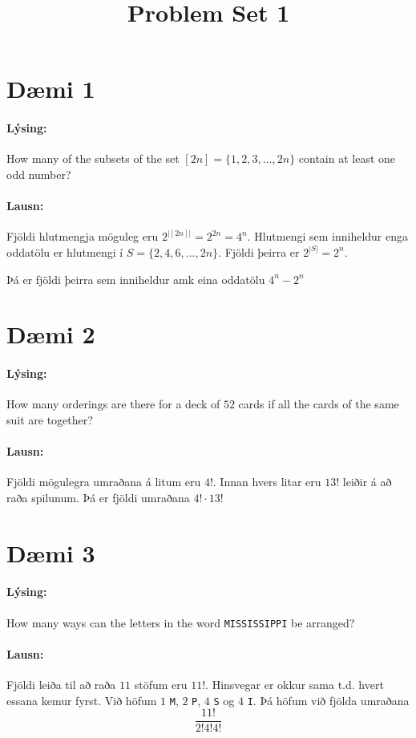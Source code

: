 \documentclass[a4paper,notitlepage]{article}
\title{\vspace{-1em}Problem Set 1\vspace{-2em}}
\date{}
\author{}
\theoremstyle{plain}
\theoremstyle{definition}
\begin{document}
\maketitle
\thispagestyle{firstpage}

\section*{Dæmi 1}
\paragraph{Lýsing:} How many of the subsets of the set $[2n] = \{1,2,3,\dots,2n\}$ contain at least one odd number?

\paragraph{Lausn:}
Fjöldi hlutmengja möguleg eru $2^{|[2n]|} = 2^{2n} = 4^n$. Hlutmengi sem inniheldur enga oddatölu er hlutmengi í $S = \{2,4,6,\dots,2n\}$. Fjöldi þeirra er $2^{|S|} = 2^n$.

Þá er fjöldi þeirra sem inniheldur amk eina oddatölu $4^n - 2^n$

\section*{Dæmi 2}
\paragraph{Lýsing:} How many orderings are there for a deck of $52$ cards if all the cards of the same suit are together?

\paragraph{Lausn:}
Fjöldi mögulegra umraðana á litum eru $4!$.
Innan hvers litar eru $13!$ leiðir á að raða spilunum. 
Þá er fjöldi umraðana $4!\cdot 13!$

\section*{Dæmi 3}
\paragraph{Lýsing:} How many ways can the letters in the word \texttt{MISSISSIPPI} be arranged?

\paragraph{Lausn:}
Fjöldi leiða til að raða $11$ stöfum eru $11!$. Hinsvegar er okkur sama t.d. hvert essana kemur fyrst.
Við höfum $1$ \texttt{M}, $2$ \texttt{P}, $4$ \texttt{S} og $4$ \texttt{I}. Þá höfum við fjölda umraðana
\begin{equation*}
    \frac{11!}{2!4!4!}
\end{equation*}
\end{document}
